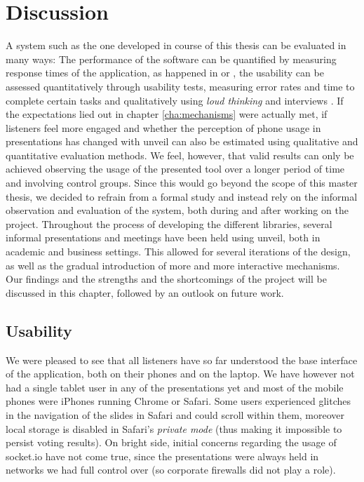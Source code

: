 \chapter{Discussion}
\label{cha:discussion}

A system such as the one developed in course of this thesis can be evaluated in many ways: The performance of the software can be quantified by measuring response times of the application, as happened in \cite{Niwa:Web-presentation-powerpoint} or \cite{Inoue:RealTimeQuestionnaire}, the usability can be assessed quantitatively through usability tests, measuring error rates and time to complete certain tasks and qualitatively using \emph{loud thinking} and interviews \cite{Reindl:automatisierte-user-interface-evaluierung}. If the expectations lied out in chapter \ref{cha:mechanisms} were actually met, if listeners feel more engaged and whether the perception of phone usage in presentations has changed with unveil can also be estimated using qualitative and quantitative evaluation methods. We feel, however, that valid results can only be achieved observing the usage of the presented tool over a longer period of time and involving control groups. Since this would go beyond the scope of this master thesis, we decided to refrain from a formal study and instead rely on the informal observation and evaluation of the system, both during and after working on the project.
Throughout the process of developing the different libraries, several informal presentations and meetings have been held using unveil, both in academic and business settings. This allowed for several iterations of the design, as well as the gradual introduction of more and more interactive mechanisms. Our findings and the strengths and the shortcomings of the project will be discussed in this chapter, followed by an outlook on future work.

\section{Usability}
\label{sec:discussion-usability}

We were pleased to see that all listeners have so far understood the base interface of the application, both on their phones and on the laptop. We have however not had a single tablet user in any of the presentations yet and most of the mobile phones were iPhones running Chrome or Safari. Some users experienced glitches in the navigation of the slides in Safari and could scroll within them, moreover local storage is disabled in Safari's \emph{private mode} (thus making it impossible to persist voting results). On bright side, initial concerns regarding the usage of socket.io have not come true, since the presentations were always held in networks we had full control over (so corporate firewalls did not play a role).

